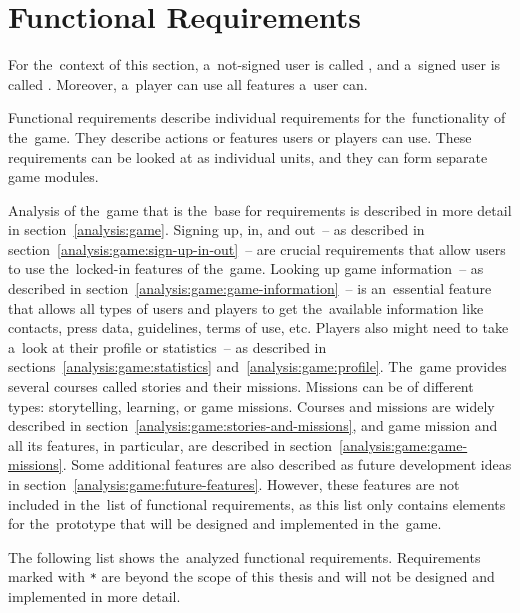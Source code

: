 \section{Functional Requirements}

For the~context of this section, a~not-signed user is called , and a~signed user is called .
Moreover, a~player can use all features a~user can. 

Functional requirements describe individual requirements for the~functionality of the~game.
They describe actions or features users or players can use.
These requirements can be looked at as individual units, and they can form separate game modules.

Analysis of the~game that is the~base for requirements is described in more detail in section~\ref{analysis:game}.
Signing up, in, and out~-- as described in section~\ref{analysis:game:sign-up-in-out}~-- are crucial requirements that allow users to use the~locked-in features of the~game.
Looking up game information~-- as described in section~\ref{analysis:game:game-information}~-- is an~essential feature that allows all types of users and players to get the~available information like contacts, press data, guidelines, terms of use, etc.
Players also might need to take a~look at their profile or statistics~-- as described in sections~\ref{analysis:game:statistics} and~\ref{analysis:game:profile}.
The~game provides several courses called stories and their missions.
Missions can be of different types: storytelling, learning, or game missions.
Courses and missions are widely described in section~\ref{analysis:game:stories-and-missions}, and game mission and all its features, in particular, are described in section~\ref{analysis:game:game-missions}.
Some additional features are also described as future development ideas in section~\ref{analysis:game:future-features}.
However, these features are not included in the~list of functional requirements, as this list only contains elements for the~prototype that will be designed and implemented in the~game.

The following list shows the~analyzed functional requirements.
Requirements marked with \texttt{*} are beyond the scope of this thesis and will not be designed and implemented in more detail.

